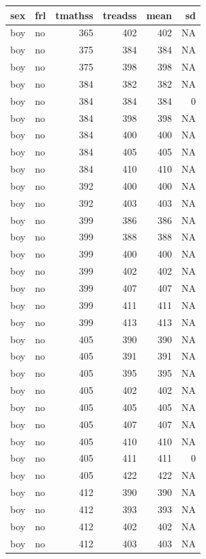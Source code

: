\documentclass[man]{apa6}
\begin{document}
\begin{tabular}{l|l|r|r|r|r}
\hline
sex & frl & tmathss & treadss & mean & sd\\
\hline
boy & no & 365 & 402 & 402 & NA\\
\hline
boy & no & 375 & 384 & 384 & NA\\
\hline
boy & no & 375 & 398 & 398 & NA\\
\hline
boy & no & 384 & 382 & 382 & NA\\
\hline
boy & no & 384 & 384 & 384 & 0\\
\hline
boy & no & 384 & 398 & 398 & NA\\
\hline
boy & no & 384 & 400 & 400 & NA\\
\hline
boy & no & 384 & 405 & 405 & NA\\
\hline
boy & no & 384 & 410 & 410 & NA\\
\hline
boy & no & 392 & 400 & 400 & NA\\
\hline
boy & no & 392 & 403 & 403 & NA\\
\hline
boy & no & 399 & 386 & 386 & NA\\
\hline
boy & no & 399 & 388 & 388 & NA\\
\hline
boy & no & 399 & 400 & 400 & NA\\
\hline
boy & no & 399 & 402 & 402 & NA\\
\hline
boy & no & 399 & 407 & 407 & NA\\
\hline
boy & no & 399 & 411 & 411 & NA\\
\hline
boy & no & 399 & 413 & 413 & NA\\
\hline
boy & no & 405 & 390 & 390 & NA\\
\hline
boy & no & 405 & 391 & 391 & NA\\
\hline
boy & no & 405 & 395 & 395 & NA\\
\hline
boy & no & 405 & 402 & 402 & NA\\
\hline
boy & no & 405 & 405 & 405 & NA\\
\hline
boy & no & 405 & 407 & 407 & NA\\
\hline
boy & no & 405 & 410 & 410 & NA\\
\hline
boy & no & 405 & 411 & 411 & 0\\
\hline
boy & no & 405 & 422 & 422 & NA\\
\hline
boy & no & 412 & 390 & 390 & NA\\
\hline
boy & no & 412 & 393 & 393 & NA\\
\hline
boy & no & 412 & 402 & 402 & NA\\
\hline
boy & no & 412 & 403 & 403 & NA\\

\end{tabular}
\end{document}
